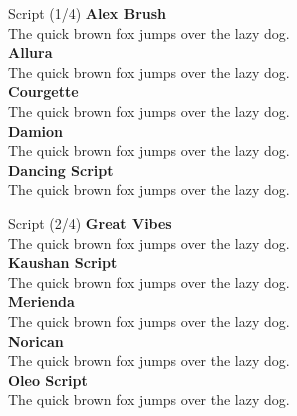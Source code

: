 \documentclass[10pt]{beamer}
\begin{document}
\begin{frame}{Script (1/4)}
\vspace{-0.2cm}
  {\AlexBrushLocal\Large\bfseries Alex Brush\\}
  {\AlexBrushLocal The quick brown fox jumps over the lazy dog.\\[0.3cm]}
  {\AlluraLocal\Large\bfseries Allura\\}
  {\AlluraLocal The quick brown fox jumps over the lazy dog.\\[0.3cm]}
  {\CourgetteLocal\Large\bfseries Courgette\\}
  {\CourgetteLocal The quick brown fox jumps over the lazy dog.\\[0.3cm]}
  {\DamionLocal\Large\bfseries Damion\\}
  {\DamionLocal The quick brown fox jumps over the lazy dog.\\[0.3cm]}
  {\DancingScriptLocal\Large\bfseries Dancing Script\\}
  {\DancingScriptLocal The quick brown fox jumps over the lazy dog.\\[0.3cm]}
\end{frame}

\begin{frame}{Script (2/4)}
\vspace{-0.2cm}
  {\GreatVibesLocal\Large\bfseries Great Vibes\\}
  {\GreatVibesLocal The quick brown fox jumps over the lazy dog.\\[0.3cm]}
  {\KaushanScriptLocal\Large\bfseries Kaushan Script\\}
  {\KaushanScriptLocal The quick brown fox jumps over the lazy dog.\\[0.3cm]}
  {\MeriendaLocal\Large\bfseries Merienda\\}
  {\MeriendaLocal The quick brown fox jumps over the lazy dog.\\[0.3cm]}
  {\NoricanLocal\Large\bfseries Norican\\}
  {\NoricanLocal The quick brown fox jumps over the lazy dog.\\[0.3cm]}
  {\OleoScriptLocal\Large\bfseries Oleo Script\\}
  {\OleoScriptLocal The quick brown fox jumps over the lazy dog.\\[0.3cm]}
\end{frame}
\end{document}
